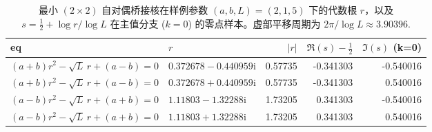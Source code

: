 \begin{table}[H]
\centering
\small
\begin{tabular}{l l r r r}
\toprule
eq & $r$ & $|r|$ & $\Re(s)-\tfrac12$ & $\Im(s)$ (k=0)\\
\midrule
$(a+b)r^2-\sqrt{L}\,r+(a-b)=0$ & $0.372678-0.440959\mathrm{i}$ & 0.57735 & -0.341303 & -0.540016\\
$(a+b)r^2-\sqrt{L}\,r+(a-b)=0$ & $0.372678+0.440959\mathrm{i}$ & 0.57735 & -0.341303 & 0.540016\\
$(a-b)r^2-\sqrt{L}\,r+(a+b)=0$ & $1.11803-1.32288\mathrm{i}$ & 1.73205 & 0.341303 & -0.540016\\
$(a-b)r^2-\sqrt{L}\,r+(a+b)=0$ & $1.11803+1.32288\mathrm{i}$ & 1.73205 & 0.341303 & 0.540016\\
\bottomrule
\end{tabular}
\caption{最小 $(2\times2)$ 自对偶桥接核在样例参数 $(a,b,L)=(2,1,5)$ 下的代数根 $r$，以及 $s=\tfrac12+\log r/\log L$ 在主值分支 ($k=0$) 的零点样本。虚部平移周期为 $2\pi/\log L\approx 3.90396$.}
\label{tab:xi-2x2-selfdual-offcritical-template}
\end{table}

